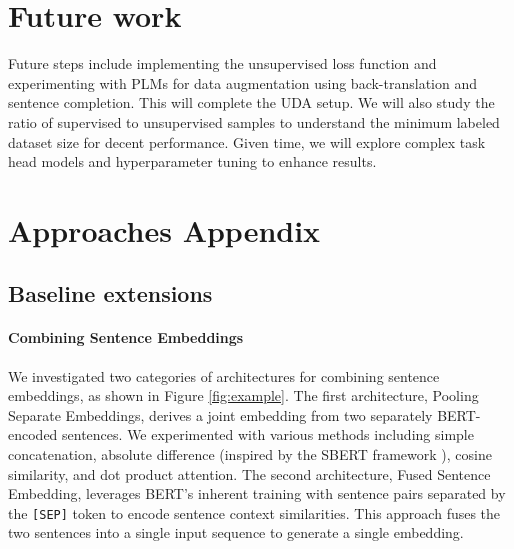 \documentclass{article}
\begin{document}
\section{Future work}
Future steps include implementing the unsupervised loss function and experimenting with 
PLMs for data augmentation using back-translation and sentence completion. This will 
complete the UDA setup. We will also study the ratio of supervised to unsupervised samples 
to understand the minimum labeled dataset size for decent performance. Given time, we will 
explore complex task head models and hyperparameter tuning to enhance results.





\newpage
\appendix
\renewcommand{\thefigure}{A\arabic{figure}}
\renewcommand{\thetable}{A\arabic{table}}
\setcounter{figure}{0}
\setcounter{table}{0}

\section{Approaches Appendix}

\subsection{Baseline extensions}
\label{sec:baseline-extensions}
\paragraph{Combining Sentence Embeddings}

We investigated two categories of architectures for combining sentence embeddings, as shown 
in Figure \ref{fig:example}. The first architecture, Pooling Separate Embeddings, derives 
a joint embedding from two separately BERT-encoded sentences. We experimented with various 
methods including simple concatenation, absolute difference (inspired by the SBERT framework 
\cite{reimers2019sentencebert}), cosine similarity, and dot product attention. 
The second architecture, 
Fused Sentence Embedding, leverages BERT's inherent training with sentence pairs separated 
by the \texttt{[SEP]} token to encode sentence context similarities. This approach fuses 
the two sentences into a single input sequence to generate a single embedding.
\end{document}
